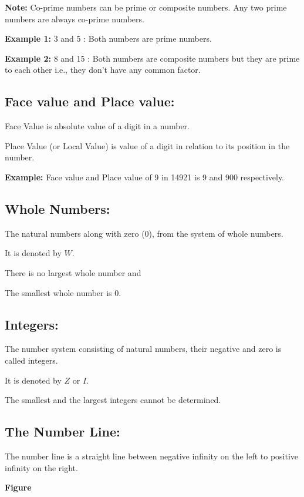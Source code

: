 \begin{multicols}{2}
\textbf{Note:} Co-prime numbers can be prime or composite numbers. Any two prime numbers are always co-prime numbers.

\textbf{Example 1:} 3 and 5 : Both numbers are prime numbers.

\textbf{Example 2:} 8 and 15 : Both numbers are composite numbers but they are prime to each other i.e., they don't have any common factor.

\subsection*{Face value and Place value:}

Face Value is absolute value of a digit in a number.

Place Value (or Local Value) is value of a digit in relation to its position in the number.

\textbf{Example:} Face value and Place value of 9 in 14921 is 9 and 900 respectively.

\subsection*{Whole Numbers:}

The natural numbers along with zero (0), from the system of whole numbers.

It is denoted by $W$.

There is no largest whole number and

The smallest whole number is 0.

\subsection*{Integers:}

The number system consisting of natural numbers, their negative and zero is called integers.

It is denoted by $Z$ or $I$.

The smallest and the largest integers cannot be determined.

\subsection*{The Number Line:}

The number line is a straight line between negative infinity on the left to positive infinity on the right.

\begin{center}
{\bf Figure}
\end{center}


\end{multicols}
